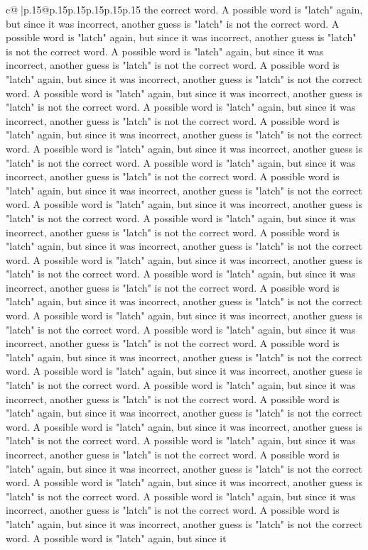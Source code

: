 \documentclass{article}
\begin{document}
{\begin{supertabular}{c@{$\;$}|p{.15\linewidth}@{}p{.15\linewidth}p{.15\linewidth}p{.15\linewidth}p{.15\linewidth}p{.15\linewidth}}
{{{the correct word. A possible word is "latch" again, but since it was incorrect, another guess is "latch" is not the correct word. A possible word is "latch" again, but since it was incorrect, another guess is "latch" is not the correct word. A possible word is "latch" again, but since it was incorrect, another guess is "latch" is not the correct word. A possible word is "latch" again, but since it was incorrect, another guess is "latch" is not the correct word. A possible word is "latch" again, but since it was incorrect, another guess is "latch" is not the correct word. A possible word is "latch" again, but since it was incorrect, another guess is "latch" is not the correct word. A possible word is "latch" again, but since it was incorrect, another guess is "latch" is not the correct word. A possible word is "latch" again, but since it was incorrect, another guess is "latch" is not the correct word. A possible word is "latch" again, but since it was incorrect, another guess is "latch" is not the correct word. A possible word is "latch" again, but since it was incorrect, another guess is "latch" is not the correct word. A possible word is "latch" again, but since it was incorrect, another guess is "latch" is not the correct word. A possible word is "latch" again, but since it was incorrect, another guess is "latch" is not the correct word. A possible word is "latch" again, but since it was incorrect, another guess is "latch" is not the correct word. A possible word is "latch" again, but since it was incorrect, another guess is "latch" is not the correct word. A possible word is "latch" again, but since it was incorrect, another guess is "latch" is not the correct word. A possible word is "latch" again, but since it was incorrect, another guess is "latch" is not the correct word. A possible word is "latch" again, but since it was incorrect, another guess is "latch" is not the correct word. A possible word is "latch" again, but since it was incorrect, another guess is "latch" is not the correct word. A possible word is "latch" again, but since it was incorrect, another guess is "latch" is not the correct word. A possible word is "latch" again, but since it was incorrect, another guess is "latch" is not the correct word. A possible word is "latch" again, but since it was incorrect, another guess is "latch" is not the correct word. A possible word is "latch" again, but since it was incorrect, another guess is "latch" is not the correct word. A possible word is "latch" again, but since it was incorrect, another guess is "latch" is not the correct word. A possible word is "latch" again, but since it was incorrect, another guess is "latch" is not the correct word. A possible word is "latch" again, but since it was incorrect, another guess is "latch" is not the correct word. A possible word is "latch" again, but since it was incorrect, another guess is "latch" is not the correct word. A possible word is "latch" again, but since it was incorrect, another guess is "latch" is not the correct word. A possible word is "latch" again, but since it was incorrect, another guess is "latch" is not the correct word. A possible word is "latch" again, but since it }}}
\end{supertabular}}
\end{document}
